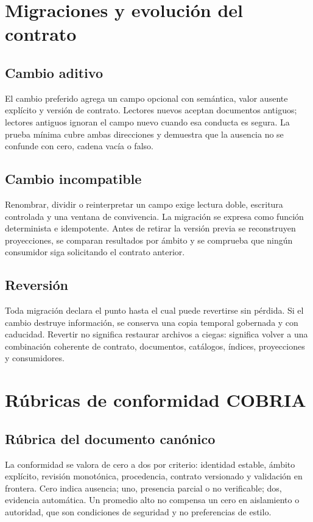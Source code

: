 \chapter{Migraciones y evolución del contrato}

\section{Cambio aditivo}

El cambio preferido agrega un campo opcional con semántica, valor ausente explícito y
versión de contrato. Lectores nuevos aceptan documentos antiguos; lectores antiguos
ignoran el campo nuevo cuando esa conducta es segura. La prueba mínima cubre ambas
direcciones y demuestra que la ausencia no se confunde con cero, cadena vacía o falso.

\section{Cambio incompatible}

Renombrar, dividir o reinterpretar un campo exige lectura doble, escritura controlada y
una ventana de convivencia. La migración se expresa como función determinista e
idempotente. Antes de retirar la versión previa se reconstruyen proyecciones, se comparan
resultados por ámbito y se comprueba que ningún consumidor siga solicitando el contrato
anterior.

\section{Reversión}

Toda migración declara el punto hasta el cual puede revertirse sin pérdida. Si el cambio
destruye información, se conserva una copia temporal gobernada y con caducidad. Revertir
no significa restaurar archivos a ciegas: significa volver a una combinación coherente
de contrato, documentos, catálogos, índices, proyecciones y consumidores.

\chapter{Rúbricas de conformidad COBRIA}

\section{Rúbrica del documento canónico}

La conformidad se valora de cero a dos por criterio: identidad estable, ámbito explícito,
revisión monotónica, procedencia, contrato versionado y validación en frontera. Cero
indica ausencia; uno, presencia parcial o no verificable; dos, evidencia automática. Un
promedio alto no compensa un cero en aislamiento o autoridad, que son condiciones de
seguridad y no preferencias de estilo.

